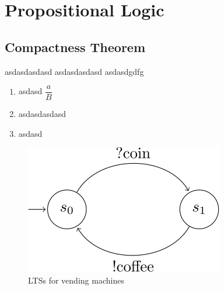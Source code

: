\documentclass[xcolor=dvipsnames, aspectratio=169, 10pt]{beamer}
\begin{document}
\TitlePage
\SectionPage
\SubsectionPage
\ProgressBar
\PageNumbering
% 
\section{Propositional Logic}
\subsection{Compactness Theorem}
\begin{frame}
  asdasdasdasd
  asdasdasdasd
  asdasdgdfg
  \cite{buss1998handbook}
  \begin{enumerate}
    \item asdasd $\dfrac{a}{B}$
    \item asdasdasdasd
    \item asdasd
  \end{enumerate}
  \begin{figure}
    \centering
    \includegraphics{tikz_images/tikz_1.svg}
    \caption{LTSs for vending machines}
    \label{fig:lts-vending-machines}
  \end{figure}
\end{frame}
\begin{frame}
  \printbibliography
\end{frame}
\end{document}
